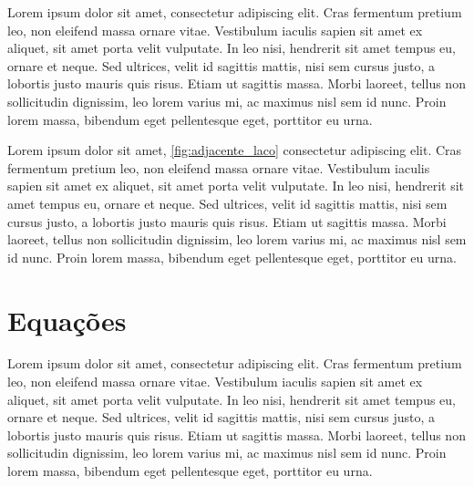 
Lorem ipsum dolor sit amet, consectetur adipiscing elit. Cras fermentum pretium leo, non eleifend massa ornare vitae. Vestibulum iaculis sapien sit amet ex aliquet, sit amet porta velit vulputate. In leo nisi, hendrerit sit amet tempus eu, ornare et neque. Sed ultrices, velit id sagittis mattis, nisi sem cursus justo, a lobortis justo mauris quis risus. Etiam ut sagittis massa. Morbi laoreet, tellus non sollicitudin dignissim, leo lorem varius mi, ac maximus nisl sem id nunc. Proin lorem massa, bibendum eget pellentesque eget, porttitor eu urna.



Lorem ipsum dolor sit amet, \autoref{fig:adjacente_laco} consectetur adipiscing elit. Cras fermentum pretium leo, non eleifend massa ornare vitae. Vestibulum iaculis sapien sit amet ex aliquet, sit amet porta velit vulputate. In leo nisi, hendrerit sit amet tempus eu, ornare et neque. Sed ultrices, velit id sagittis mattis, nisi sem cursus justo, a lobortis justo mauris quis risus. Etiam ut sagittis massa. Morbi laoreet, tellus non sollicitudin dignissim, leo lorem varius mi, ac maximus nisl sem id nunc. Proin lorem massa, bibendum eget pellentesque eget, porttitor eu urna.



\chapter{Equações}

Lorem ipsum dolor sit amet, consectetur adipiscing elit. Cras fermentum pretium leo, non eleifend massa ornare vitae. Vestibulum iaculis sapien sit amet ex aliquet, sit amet porta velit vulputate. In leo nisi, hendrerit sit amet tempus eu, ornare et neque. Sed ultrices, velit id sagittis mattis, nisi sem cursus justo, a lobortis justo mauris quis risus. Etiam ut sagittis massa. Morbi laoreet, tellus non sollicitudin dignissim, leo lorem varius mi, ac maximus nisl sem id nunc. Proin lorem massa, bibendum eget pellentesque eget, porttitor eu urna.



